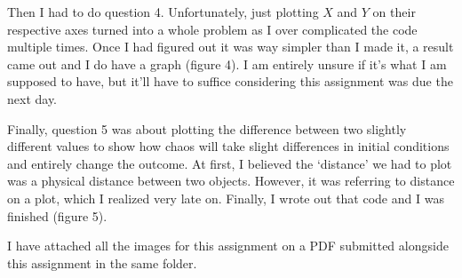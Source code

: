 \documentclass{article}
\begin{document}
Then I had to do question 4. Unfortunately, just plotting \( X \) and \( Y \) on their respective axes turned into a whole problem as I over complicated the code multiple times. Once I had figured out it was way simpler than I made it, a result came out and I do have a graph (figure 4). I am entirely unsure if it’s what I am supposed to have, but it’ll have to suffice considering this assignment was due the next day. 

Finally, question 5 was about plotting the difference between two slightly different values to show how chaos will take slight differences in initial conditions and entirely change the outcome. At first, I believed the ‘distance’ we had to plot was a physical distance between two objects. However, it was referring to distance on a plot, which I realized very late on. Finally, I wrote out that code and I was finished (figure 5).

I have attached all the images for this assignment on a PDF submitted alongside this assignment in the same folder. 
\end{document}
